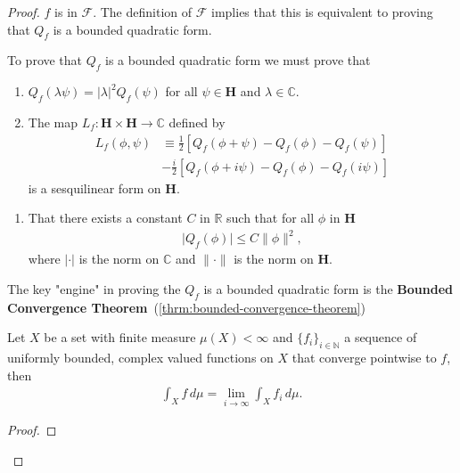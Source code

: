 \begin{proof}
    \leanok
$f$ is in $\mathcal{F}$. The definition of $\mathcal{F}$ implies that this is equivalent to proving that $Q_f$ is a bounded quadratic form.

To prove that $Q_f$ is a bounded quadratic form we must prove that
\begin{enumerate}
    \item $Q_f(\lambda\psi) = \lvert\lambda \rvert^2 Q_f(\psi)$ for all $\psi \in \mathbf{H}$ and $\lambda \in \mathbb{C}$.
    \item The map $L_f : \mathbf{H} \times \mathbf{H} \rightarrow \mathbb{C}$ defined by
    \begin{align}
        L_f(\phi, \psi) &\equiv \frac{1}{2} \left[ Q_f(\phi + \psi) - Q_f(\phi) - Q_f(\psi) \right] \\
                                                        &-\frac{i}{2} \left[ Q_f(\phi + i\psi) - Q_f(\phi) - Q_f(i\psi) \right]
    \end{align}
    is a sesquilinear form on $\mathbf{H}$.
\end{enumerate}
\begin{enumerate}
    \item That there exists a constant $C$ in $\mathbb{R}$ such that for all $\phi$ in $\mathbf{H}$
    \begin{align}
        \lvert Q_f(\phi) \rvert \le C \|\phi\|^2,
    \end{align}
    where $\lvert \cdot \rvert$ is the norm on $\mathbb{C}$ and $\|\cdot\|$ is the norm on $\mathbf{H}$.
\end{enumerate}
The key "engine" in proving the $Q_f$ is a bounded quadratic form is the \textbf{Bounded Convergence Theorem}~(\ref{thrm:bounded-convergence-theorem})

\begin{theorem}
    \label{thrm:bounded-convergence-theorem}
    \leanok
    Let $X$ be a set with finite measure $\mu(X) < \infty$ and $\{ f_i \}_{i \in \mathbb{N}}$ a sequence of uniformly bounded, complex valued functions on $X$ that converge pointwise to $f$, then
    \begin{align}
        \int_X f \, d\mu = \lim\limits_{i \rightarrow \infty} \int_X f_i \, d\mu.
    \end{align}
\end{theorem}
\begin{proof}
\leanok
\end{proof}


\end{proof}
